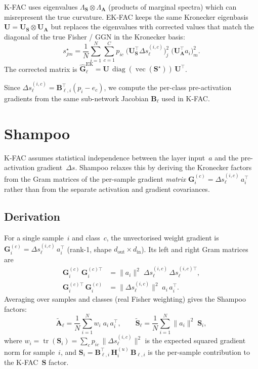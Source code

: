 \documentclass[11pt]{article}
\DeclareMathOperator{\diag}{diag}
\DeclareMathOperator{\tr}{tr}
\DeclareMathOperator{\vect}{vec}
\newcommand{\kron}{\otimes}
\begin{document}
K-FAC uses eigenvalues $\Lambda_{\mathbf{S}}\kron\Lambda_{\mathbf{A}}$
(products of marginal spectra) which can misrepresent the true curvature.
EK-FAC keeps the same Kronecker eigenbasis
$\mathbf{U} = \mathbf{U}_{\mathbf{S}}\kron\mathbf{U}_{\mathbf{A}}$ but
replaces the eigenvalues with corrected values that match the diagonal
of the true Fisher / GGN in the Kronecker basis:
\[
  s^\star_{jm}
  = \frac{1}{N}\sum_{i=1}^{N}\sum_{c=1}^{C}
    p_{ic}\;
    \bigl(\mathbf{U}_{\mathbf{S}}^\top
          \Delta s_\ell^{(i,c)}\bigr)_j^2
    \;\bigl(\mathbf{U}_{\mathbf{A}}^\top a_i\bigr)_m^2.
\]
The corrected matrix is
$\hat{\mathbf{G}}_\ell^{\text{EK}} =
 \mathbf{U}\,\diag(\vect(\mathbf{S}^\star))\,\mathbf{U}^\top$.

Since $\Delta s_\ell^{(i,c)} = \mathbf{B}_{\ell,i}^\top(p_i - e_c)$,
we compute the per-class pre-activation gradients from the same
sub-network Jacobian $\mathbf{B}_\ell$ used in K-FAC.

\section{Shampoo}

K-FAC assumes statistical independence between the layer input~$a$
and the pre-activation gradient~$\Delta s$.  Shampoo relaxes this by
deriving the Kronecker factors from the Gram matrices of the
per-sample gradient \emph{matrix}
$\mathbf{G}_i^{(c)} = \Delta s_\ell^{(i,c)}\,a_i^\top$
rather than from the separate activation and gradient covariances.

\subsection{Derivation}

For a single sample~$i$ and class~$c$, the unvectorised weight
gradient is $\mathbf{G}_i^{(c)} = \Delta s_\ell^{(i,c)}\,a_i^\top$
(rank-1, shape $d_{\text{out}}\times d_{\text{in}}$).
Its left and right Gram matrices are
\begin{align*}
  \mathbf{G}_i^{(c)}\,\mathbf{G}_i^{(c)\top}
  &= \|a_i\|^2\;\Delta s_\ell^{(i,c)}\,\Delta s_\ell^{(i,c)\top},\\[4pt]
  \mathbf{G}_i^{(c)\top}\,\mathbf{G}_i^{(c)}
  &= \|\Delta s_\ell^{(i,c)}\|^2\; a_i\,a_i^\top.
\end{align*}
Averaging over samples and classes (real Fisher weighting) gives the
Shampoo factors:
\[
  \tilde{\mathbf{A}}_\ell
  = \frac{1}{N}\sum_{i=1}^{N} w_i\; a_i\,a_i^\top,
  \qquad
  \tilde{\mathbf{S}}_\ell
  = \frac{1}{N}\sum_{i=1}^{N} \|a_i\|^2\; \mathbf{S}_i,
\]
where $w_i = \tr(\mathbf{S}_i)
= \sum_c p_{ic}\,\|\Delta s_\ell^{(i,c)}\|^2$
is the expected squared gradient norm for sample~$i$, and
$\mathbf{S}_i = \mathbf{B}_{\ell,i}^\top\,\mathbf{H}_i^{(u)}\,
\mathbf{B}_{\ell,i}$
is the per-sample contribution to the K-FAC~$\mathbf{S}$ factor.
\end{document}
